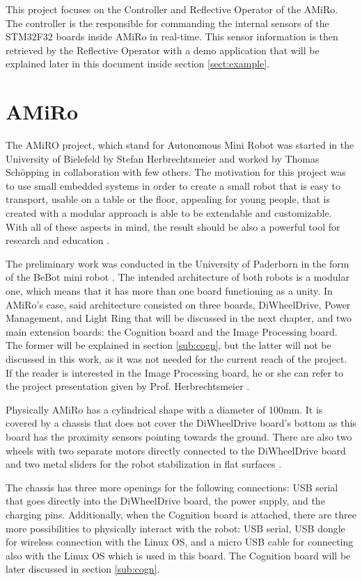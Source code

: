 \documentclass[12pt]{report}%
\begin{document}
This project focuses on the Controller and Reflective Operator of the AMiRo. The controller is the responsible for commanding the internal sensors of the STM32F32 boards inside AMiRo in real-time. This sensor information is then retrieved by the Reflective Operator with a demo application that will be explained later in this document inside section \ref{sect:example}.

\section{AMiRo}
The AMiRO project, which stand for Autonomous Mini Robot was started in the University of Bielefeld by Stefan Herbrechtsmeier and worked by Thomas Schöpping in collaboration with few others. The motivation for this project was to use small embedded systems in order to create a small robot that is easy to transport, usable on a table or the floor, appealing for young people, that is created with a modular approach is able to be extendable and customizable. With all of these aspects in mind, the result should be also a powerful tool for research and education \cite{AMiRo_ppt_v1}.

The preliminary work was conducted in the University of Paderborn in the form of the BeBot mini robot \cite{AMiRo_ppt_v1}. The intended architecture of both robots is a modular one, which means that it has more than one board functioning as a unity. In AMiRo's case, said architecture consisted on three boards, DiWheelDrive, Power Management, and Light Ring that will be discussed in the next chapter, and two main extension boards: the Cognition board and the Image Processing board. The former will be explained in section \ref{sub:cogn}, but the latter will not be discussed in this work, as it was not needed for the current reach of the project. If the reader is interested in the Image Processing board, he or she can refer to the project presentation given by Prof. Herbrechtsmeier \cite{AMiRo_ppt_v2}.

Physically AMiRo has a cylindrical shape with a diameter of 100mm. It is covered by a chassis that does not cover the DiWheelDrive board's bottom as this board has the proximity sensors pointing towards the ground. There are also two wheels with two separate motors directly connected to the DiWheelDrive board and two metal sliders for the robot stabilization in flat surfaces \cite{AMiRo_paper_modular}.

The chassis has three more openings for the following connections: USB serial that goes directly into the DiWheelDrive board, the power supply, and the charging pins. Additionally, when the Cognition board is attached, there are three more possibilities to physically interact with the robot: USB serial, USB dongle for wireless connection with the Linux OS, and a micro USB cable for connecting also with the Linux OS which is used in this board. The Cognition board will be later discussed in section \ref{sub:cogn}.
\end{document}
